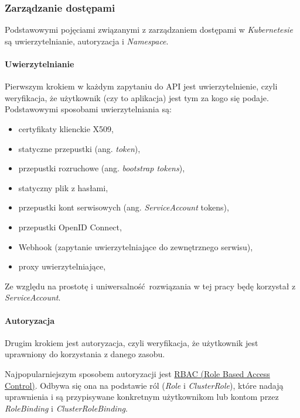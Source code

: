 \documentclass[a4paper,12pt,twoside,openany]{report}
\providecommand{\tightlist}{%
  \setlength{\itemsep}{0pt}\setlength{\parskip}{0pt}}
\begin{document}
\hypertarget{zarzux105dzanie-dostux119pami}{%
\subsubsection{Zarządzanie
dostępami}\label{zarzux105dzanie-dostux119pami}}

Podstawowymi pojęciami związanymi z zarządzaniem dostępami w
\emph{Kubernetesie} są uwierzytelnianie, autoryzacja i \emph{Namespace}.

\hypertarget{uwierzytelnianie}{%
\paragraph{Uwierzytelnianie}\label{uwierzytelnianie}}

Pierwszym krokiem w każdym zapytaniu do API jest uwierzytelnienie, czyli
weryfikacja, że użytkownik (czy to aplikacja) jest tym za kogo się
podaje. Podstawowymi sposobami uwierzytelniania są:

\begin{itemize}
\tightlist
\item
  certyfikaty klienckie X509,
\item
  statyczne przepustki (ang. \emph{token}),
\item
  przepustki rozruchowe (ang. \emph{bootstrap tokens}),
\item
  statyczny plik z hasłami,
\item
  przepustki kont serwisowych (ang. \emph{ServiceAccount} tokens),
\item
  przepustki OpenID Connect,
\item
  Webhook (zapytanie uwierzytelniające do zewnętrznego serwisu),
\item
  proxy uwierzytelniające,
\end{itemize}

Ze względu na prostotę i uniwersalność~rozwiązania w tej pracy będę
korzystał z \emph{ServiceAccount}.

\hypertarget{autoryzacja}{%
\paragraph{Autoryzacja}\label{autoryzacja}}

Drugim krokiem jest autoryzacja, czyli weryfikacja, że użytkownik jest
uprawniony do korzystania z danego zasobu.

Najpopularniejszym sposobem autoryzacji jest
\href{https://kubernetes.io/docs/admin/authorization/rbac/}{RBAC (Role
Based Access Control)}. Odbywa się ona na podstawie ról (\emph{Role} i
\emph{ClusterRole}), które nadają uprawnienia i są przypisywane
konkretnym użytkownikom lub kontom przez \emph{RoleBinding} i
\emph{ClusterRoleBinding}.
\end{document}
